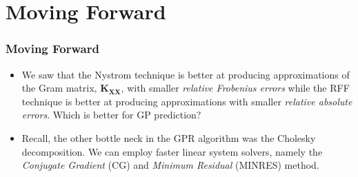 \documentclass[9pt,hyperref={pdfpagelabels=false},xcolor=table]{beamer}
\begin{document}
\section{Moving Forward}

\begin{frame}
    \frametitle{Moving Forward}
    \begin{itemize}
        \item We saw that the Nystrom technique is better at producing approximations of the Gram matrix, $\bm{K}_{\bm{XX}}$, with smaller {\it relative Frobenius errors} while the RFF technique is better at producing approximations with smaller {\it relative absolute errors}. Which is better for GP prediction?
        \item Recall, the other bottle neck in the GPR algorithm was the Cholesky decomposition. We can employ faster linear system solvers, namely the {\it Conjugate Gradient} (CG) and {\it Minimum Residual} (MINRES) method.
    \end{itemize}
\end{frame}
\end{document}

